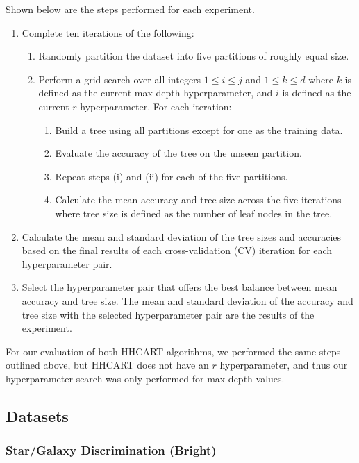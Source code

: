\documentclass[10pt]{article} %
\begin{document}
Shown below are the steps performed for each experiment.

\begin{enumerate}
	\item Complete ten iterations of the following:
    \begin{enumerate}
        \item Randomly partition the dataset into five partitions of roughly equal size.
		\item Perform a grid search over all integers $1 \leq i \leq j$ and $1 \leq k \leq d$ where $k$ is defined as the current max depth hyperparameter, and $i$ is defined as the current $r$ hyperparameter. For each iteration:
		\begin{enumerate}
			\item Build a tree using all partitions except for one as the training data.
			\item Evaluate the accuracy of the tree on the unseen partition.
			\item Repeat steps (i) and (ii) for each of the five partitions.
			\item Calculate the mean accuracy and tree size across the five iterations where tree size is defined as the number of leaf nodes in the tree.
            \end{enumerate}
    \end{enumerate}
\item Calculate the mean and standard deviation of the tree sizes and accuracies based on the final results of each cross-validation (CV) \citep{cv} iteration for each hyperparameter pair.
    \item Select the hyperparameter pair that offers the best balance between mean accuracy and tree size. The mean and standard deviation of the accuracy and tree size with the selected hyperparameter pair are the results of the experiment.
\end{enumerate}

For our evaluation of both HHCART algorithms, we performed the same steps outlined above, but HHCART does not have an $r$ hyperparameter, and thus our hyperparameter search was only performed for max depth values.

\subsection{Datasets}\label{datasets}

\subsubsection{Star/Galaxy Discrimination (Bright)}\label{sg_bright}
\end{document}
